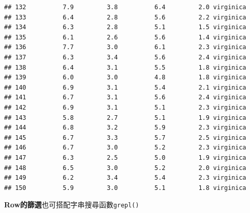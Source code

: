 \documentclass[]{book}
\newenvironment{Shaded}{\begin{snugshade}}{\end{snugshade}}
\newcommand{\KeywordTok}[1]{\textcolor[rgb]{0.13,0.29,0.53}{\textbf{{#1}}}}
\newcommand{\StringTok}[1]{\textcolor[rgb]{0.31,0.60,0.02}{{#1}}}
\newcommand{\NormalTok}[1]{{#1}}
\theoremstyle{definition}
\theoremstyle{definition}
\theoremstyle{remark}
\begin{document}
\begin{verbatim}
## 132          7.9         3.8          6.4         2.0 virginica
## 133          6.4         2.8          5.6         2.2 virginica
## 134          6.3         2.8          5.1         1.5 virginica
## 135          6.1         2.6          5.6         1.4 virginica
## 136          7.7         3.0          6.1         2.3 virginica
## 137          6.3         3.4          5.6         2.4 virginica
## 138          6.4         3.1          5.5         1.8 virginica
## 139          6.0         3.0          4.8         1.8 virginica
## 140          6.9         3.1          5.4         2.1 virginica
## 141          6.7         3.1          5.6         2.4 virginica
## 142          6.9         3.1          5.1         2.3 virginica
## 143          5.8         2.7          5.1         1.9 virginica
## 144          6.8         3.2          5.9         2.3 virginica
## 145          6.7         3.3          5.7         2.5 virginica
## 146          6.7         3.0          5.2         2.3 virginica
## 147          6.3         2.5          5.0         1.9 virginica
## 148          6.5         3.0          5.2         2.0 virginica
## 149          6.2         3.4          5.4         2.3 virginica
## 150          5.9         3.0          5.1         1.8 virginica
\end{verbatim}

\textbf{Row的篩選}也可搭配字串搜尋函數\texttt{grepl()}

\begin{Shaded}
\end{Shaded}
\end{document}

